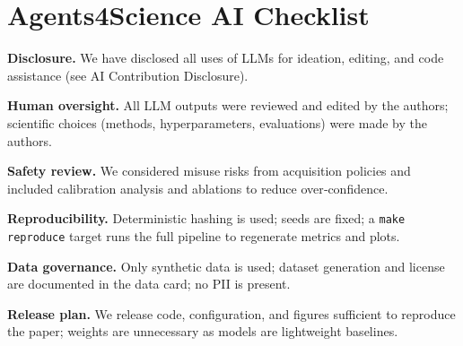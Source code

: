 \section*{Agents4Science AI Checklist}

\textbf{Disclosure.} We have disclosed all uses of LLMs for ideation, editing, and code assistance (see AI Contribution Disclosure).

\textbf{Human oversight.} All LLM outputs were reviewed and edited by the authors; scientific choices (methods, hyperparameters, evaluations) were made by the authors.

\textbf{Safety review.} We considered misuse risks from acquisition policies and included calibration analysis and ablations to reduce over‑confidence.

\textbf{Reproducibility.} Deterministic hashing is used; seeds are fixed; a \texttt{make reproduce} target runs the full pipeline to regenerate metrics and plots.

\textbf{Data governance.} Only synthetic data is used; dataset generation and license are documented in the data card; no PII is present.

\textbf{Release plan.} We release code, configuration, and figures sufficient to reproduce the paper; weights are unnecessary as models are lightweight baselines.

